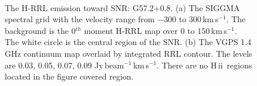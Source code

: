 \documentclass[manuscript]{aastex61}
\newcommand{\hii}{{\rm H\,}{{\sc ii}}}
\newcommand{\kms}{\,km\,s$^{-1}$}
\begin{document}
\begin{figure}[H]
	\centering
	\\
	\caption{The H-RRL emission toward SNR: G57.2+0.8.
	(a) The SIGGMA spectral grid with the velocity range from $-300$ to $300$\kms.
	The background is the 0$^{th}$ moment H-RRL map over $0$ to $150$\kms.
	The white circle is the central region of the SNR.
	(b) The VGPS 1.4 GHz continuum map overlaid by integrated RRL contour.
	The levels are 0.03, 0.05, 0.07, 0.09 Jy\,beam$^{-1}$\kms.
	There are no \hii\ regions located in the figure covered region.
	}
	\label{fig_snr-g572}

\end{figure}

\newpage



\end{document}
